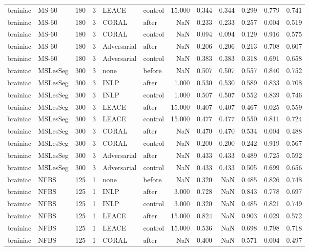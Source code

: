 \begin{tabular}{llrrllrrrrrr}
brainiac & MS-60 & 180 & 3 & LEACE & control & 15.000 & 0.344 & 0.344 & 0.299 & 0.779 & 0.741 \\
brainiac & MS-60 & 180 & 3 & CORAL & after & NaN & 0.233 & 0.233 & 0.257 & 0.004 & 0.519 \\
brainiac & MS-60 & 180 & 3 & CORAL & control & NaN & 0.094 & 0.094 & 0.129 & 0.916 & 0.575 \\
brainiac & MS-60 & 180 & 3 & Adversarial & after & NaN & 0.206 & 0.206 & 0.213 & 0.708 & 0.607 \\
brainiac & MS-60 & 180 & 3 & Adversarial & control & NaN & 0.383 & 0.383 & 0.318 & 0.691 & 0.658 \\
brainiac & MSLesSeg & 300 & 3 & none & before & NaN & 0.507 & 0.507 & 0.557 & 0.840 & 0.752 \\
brainiac & MSLesSeg & 300 & 3 & INLP & after & 1.000 & 0.530 & 0.530 & 0.589 & 0.833 & 0.708 \\
brainiac & MSLesSeg & 300 & 3 & INLP & control & 1.000 & 0.507 & 0.507 & 0.552 & 0.839 & 0.746 \\
brainiac & MSLesSeg & 300 & 3 & LEACE & after & 15.000 & 0.407 & 0.407 & 0.467 & 0.025 & 0.559 \\
brainiac & MSLesSeg & 300 & 3 & LEACE & control & 15.000 & 0.477 & 0.477 & 0.550 & 0.811 & 0.724 \\
brainiac & MSLesSeg & 300 & 3 & CORAL & after & NaN & 0.470 & 0.470 & 0.534 & 0.004 & 0.488 \\
brainiac & MSLesSeg & 300 & 3 & CORAL & control & NaN & 0.200 & 0.200 & 0.242 & 0.919 & 0.567 \\
brainiac & MSLesSeg & 300 & 3 & Adversarial & after & NaN & 0.433 & 0.433 & 0.489 & 0.725 & 0.592 \\
brainiac & MSLesSeg & 300 & 3 & Adversarial & control & NaN & 0.433 & 0.433 & 0.505 & 0.699 & 0.656 \\
brainiac & NFBS & 125 & 1 & none & before & NaN & 0.320 & NaN & 0.485 & 0.826 & 0.748 \\
brainiac & NFBS & 125 & 1 & INLP & after & 3.000 & 0.728 & NaN & 0.843 & 0.778 & 0.697 \\
brainiac & NFBS & 125 & 1 & INLP & control & 3.000 & 0.320 & NaN & 0.485 & 0.821 & 0.749 \\
brainiac & NFBS & 125 & 1 & LEACE & after & 15.000 & 0.824 & NaN & 0.903 & 0.029 & 0.572 \\
brainiac & NFBS & 125 & 1 & LEACE & control & 15.000 & 0.536 & NaN & 0.698 & 0.798 & 0.718 \\
brainiac & NFBS & 125 & 1 & CORAL & after & NaN & 0.400 & NaN & 0.571 & 0.004 & 0.497 \\

\end{tabular}
